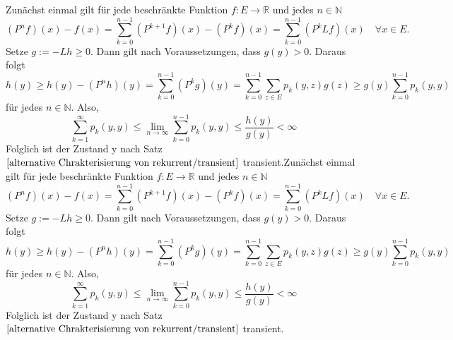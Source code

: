 Zunächst einmal gilt für jede beschränkte Funktion $f: E \to \mathbb{R}$ und jedes $n \in \mathbb{N}$
\begin{equation*}
(P^{n}f)(x) - f(x) = \sum_{k=0}^{n-1} (P^{k+1}f)(x) - (P^{k}f)(x) = \sum_{k=0}^{n-1} (P^{k} Lf)(x) \quad \forall x \in E.
\end{equation*}
Setze $g:= -Lh \geq 0$. Dann gilt nach Voraussetzungen, dass $g(y) > 0$. Daraus folgt
\begin{equation*}
h(y) \geq h(y) - (P^{n}h)(y) = \sum_{k=0}^{n-1} (P^{k}g)(y) = \sum_{k=0}^{n-1} \sum_{z \in E} p_{k}(y,z)g(z) \geq g(y) \sum_{k=0}^{n-1} p_{k}(y,y)
\end{equation*}
für jedes $n \in \mathbb{N}$. Also,
\begin{equation*}
\sum_{k=1}^{\infty} p_{k}(y,y) \leq \lim_{n \to \infty} \sum_{k=0}^{n-1} p_{k}(y,y) \leq \dfrac{h(y)}{g(y)} < \infty
\end{equation*}
Folglich ist der Zustand y nach Satz $\ref{alternative Chrakterisierung von rekurrent/transient}$ transient.Zunächst einmal gilt für jede beschränkte Funktion $f: E \to \mathbb{R}$ und jedes $n \in \mathbb{N}$
\begin{equation*}
(P^{n}f)(x) - f(x) = \sum_{k=0}^{n-1} (P^{k+1}f)(x) - (P^{k}f)(x) = \sum_{k=0}^{n-1} (P^{k} Lf)(x) \quad \forall x \in E.
\end{equation*}
Setze $g:= -Lh \geq 0$. Dann gilt nach Voraussetzungen, dass $g(y) > 0$. Daraus folgt
\begin{equation*}
h(y) \geq h(y) - (P^{n}h)(y) = \sum_{k=0}^{n-1} (P^{k}g)(y) = \sum_{k=0}^{n-1} \sum_{z \in E} p_{k}(y,z)g(z) \geq g(y) \sum_{k=0}^{n-1} p_{k}(y,y)
\end{equation*}
für jedes $n \in \mathbb{N}$. Also,
\begin{equation*}
\sum_{k=1}^{\infty} p_{k}(y,y) \leq \lim_{n \to \infty} \sum_{k=0}^{n-1} p_{k}(y,y) \leq \dfrac{h(y)}{g(y)} < \infty
\end{equation*}
Folglich ist der Zustand y nach Satz $\ref{alternative Chrakterisierung von rekurrent/transient}$ transient.
